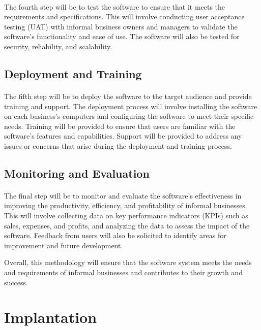 \documentclass{article}
\begin{document}
\paragraph*{}
The fourth step will be to test the software to ensure that it meets the requirements and specifications. This will involve conducting user acceptance testing (UAT) with informal business owners and managers to validate the software's functionality and ease of use. The software will also be tested for security, reliability, and scalability.

\subsection*{Deployment and Training}
\paragraph*{}
The fifth step will be to deploy the software to the target audience and provide training and support. The deployment process will involve installing the software on each business's computers and configuring the software to meet their specific needs. Training will be provided to ensure that users are familiar with the software's features and capabilities. Support will be provided to address any issues or concerns that arise during the deployment and training process.

\subsection*{Monitoring and Evaluation}
\paragraph*{}
The final step will be to monitor and evaluate the software's effectiveness in improving the productivity, efficiency, and profitability of informal businesses. This will involve collecting data on key performance indicators (KPIs) such as sales, expenses, and profits, and analyzing the data to assess the impact of the software. Feedback from users will also be solicited to identify areas for improvement and future development.

Overall, this methodology will ensure that the software system meets the needs and requirements of informal businesses and contributes to their growth and success.
\newpage


\section*{Implantation}
\lipsum[1-2]
\newpage
\end{document}
